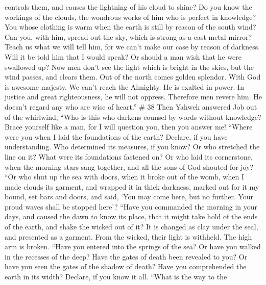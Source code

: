 controls them, and causes the lightning of his cloud to shine?
 Do you know the workings of the clouds, the wondrous
works of him who is perfect in knowledge?  You whose
clothing is warm when the earth is still by reason of the south wind?
 Can you, with him, spread out the sky, which is strong
as a cast metal mirror?  Teach us what we will tell him,
for we can't make our case by reason of darkness.  Will
it be told him that I would speak? Or should a man wish that he were
swallowed up?  Now men don't see the light which is
bright in the skies, but the wind passes, and clears them.
 Out of the north comes golden splendor. With God is
awesome majesty.  We can't reach the Almighty. He is
exalted in power. In justice and great righteousness, he will not
oppress.  Therefore men revere him. He doesn't regard any
who are wise of heart.'' \# 38  Then Yahweh answered Job
out of the whirlwind,  ``Who is this who darkens counsel
by words without knowledge?  Brace yourself like a man,
for I will question you, then you answer me!  ``Where were
you when I laid the foundations of the earth? Declare, if you have
understanding.  Who determined its measures, if you know?
Or who stretched the line on it?  What were its
foundations fastened on? Or who laid its cornerstone, 
when the morning stars sang together, and all the sons of God shouted
for joy?  ``Or who shut up the sea with doors, when it
broke out of the womb,  when I made clouds its garment,
and wrapped it in thick darkness,  marked out for it my
bound, set bars and doors,  and said, `You may come here,
but no further. Your proud waves shall be stopped here'? 
``Have you commanded the morning in your days, and caused the dawn to
know its place,  that it might take hold of the ends of
the earth, and shake the wicked out of it?  It is changed
as clay under the seal, and presented as a garment.  From
the wicked, their light is withheld. The high arm is broken.
 ``Have you entered into the springs of the sea? Or have
you walked in the recesses of the deep?  Have the gates
of death been revealed to you? Or have you seen the gates of the shadow
of death?  Have you comprehended the earth in its width?
Declare, if you know it all.  ``What is the way to the
